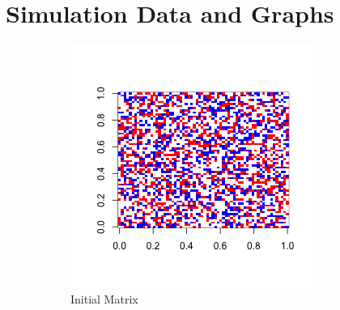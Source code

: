 \documentclass{article}
\begin{document}
 

\section{Simulation Data and Graphs}


\begin{figure}
        \centering
        \begin{subfigure}[b]{0.3\textwidth}
                \includegraphics[width=\textwidth]{example001}
                \caption{Initial Matrix}
        \end{subfigure}
        \begin{subfigure}[b]{0.3\textwidth}

\end{subfigure}
\end{figure}
\end{document}
